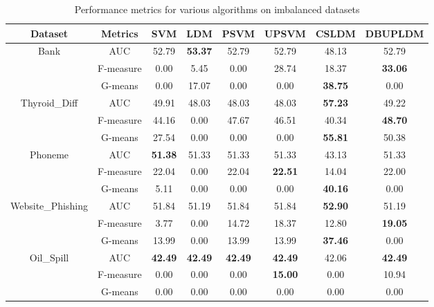 \documentclass[a4paper]{cas-sc}
\begin{document}
\begin{table}[htbp]
\renewcommand\arraystretch{1}
  \centering
      \caption{Performance metrics for various algorithms on imbalanced datasets}\label{metrics}
    \setlength{\tabcolsep}{3 mm}
    \small
    \begin{tabular}{cccccccc}
    \toprule
    \multicolumn{1}{c}{Dataset} & Metrics & SVM   & LDM   & PSVM  & UPSVM & CSLDM & DBUPLDM \\
    \midrule
    \multicolumn{1}{c}{\multirow{3}[2]{*}{Bank}} & AUC   & 52.79  & \textbf{53.37 } & 52.79  & 52.79 & 48.13 & 52.79 \\
          & F-measure & 0.00  & 5.45  & 0.00  & 28.74 & 18.37 & \textbf{33.06} \\
          & G-means & 0.00  & 17.07  & 0.00  & 0.00  & \textbf{38.75} & 0.00 \\
    \midrule
    \multicolumn{1}{c}{\multirow{3}[2]{*}{Thyroid\_Diff}} & AUC   & 49.91  & 48.03  & 48.03  & 48.03  & \textbf{57.23 } & 49.22  \\
          & F-measure & 44.16  & 0.00  & 47.67  & 46.51  & 40.34  & \textbf{48.70 } \\
          & G-means & 27.54  & 0.00  & 0.00  & 0.00  & \textbf{55.81 } & 50.38  \\
    \midrule
    \multicolumn{1}{c}{\multirow{3}[2]{*}{Phoneme}} & AUC   & \textbf{51.38 } & 51.33  & 51.33 & 51.33 & 43.13 & 51.33 \\
          & F-measure & 22.04  & 0.00  & 22.04 & \textbf{22.51} & 14.04 & 22.00 \\
          & G-means & 5.11  & 0.00  & 0.00  & 0.00  & \textbf{40.16} & 0.00 \\
    \midrule
    \multicolumn{1}{c}{\multirow{3}[2]{*}{Website\_Phishing}} & AUC   & 51.84  & 51.19  & 51.84 & 51.84 & \textbf{52.90} & 51.19 \\
          & F-measure & 3.77  & 0.00  & 14.72 & 18.37 & 12.80 & \textbf{19.05} \\
          & G-means & 13.99  & 0.00  & 13.99 & 13.99 & \textbf{37.46} & 0.00 \\
    \midrule
    \multicolumn{1}{c}{\multirow{3}[2]{*}{Oil\_Spill}} & AUC   & \textbf{42.49 } & \textbf{42.49 } & \textbf{42.49} & \textbf{42.49} & 42.06 & \textbf{42.49} \\
          & F-measure & 0.00  & 0.00  & 0.00  & \textbf{15.00} & 0.00  & 10.94 \\
          & G-means & 0.00  & 0.00  & 0.00  & 0.00  & 0.00  & 0.00 \\

\end{tabular}
\end{table}
\end{document}
